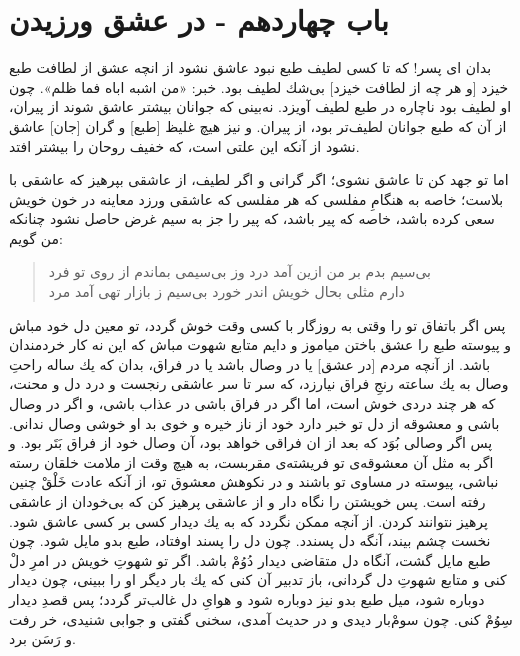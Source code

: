 
\section*{باب چهاردهم - 
در عشق ورزيدن}



بدان اى پسر! كه تا كسى لطيف طبع نبود عاشق نشود از انچه عشق از لطافت طبع خيزد [و هر چه از لطافت خيزد] بى‌شك لطيف بود. خبر: «من اشبه اباه فما ظلم». چون او لطيف بود ناچاره در طبع لطيف آويزد. نه‌بينى كه جوانان بيشتر عاشق شوند از پيران، از آن كه طبع جوانان لطيف‌تر بود، از پيران. و نيز هيچ غليظ [طبع] و گران [جان] عاشق نشود از آنكه اين علتى است، كه خفيف روحان را بيشتر افتد.

اما تو جهد كن تا عاشق نشوى؛ اگر گرانى و اگر لطيف، از عاشقى بپرهيز كه عاشقى با بلاست؛ خاصه به هنگامِ مفلسى كه هر مفلسى كه عاشقى ورزد معاينه در خون خويش سعى كرده باشد، خاصه كه پير باشد، كه پير را جز به سيم غرض حاصل نشود چنانكه من گويم:

\begin{quote}
\centering
بى‌سيم بدم بر من ازين آمد درد \quad \quad وز بى‌سيمى بماندم از روى تو فرد \\
دارم مثلى بحال خويش اندر خورد \quad \quad بى‌سيم ز بازار تهى آمد مرد
\end{quote}

پس اگر باتفاق تو را وقتى به روزگار با كسى وقت خوش گردد، تو معين دل خود مباش و پيوسته طبع را عشق باختن مياموز و دايم متابع شهوت مباش كه اين نه كار خردمندان باشد. از آنچه مردم [در عشق] يا در وصال باشد يا در فراق، بدان كه يك ساله راحت‌ِ وصال به يك ساعته رنجِ فراق نیارزد، كه سر تا سر عاشقى رنجست و درد دل و محنت، كه هر چند دردى خوش است، اما اگر در فراق باشى در عذاب باشى، و اگر در وصال باشى و معشوقه از دل تو خبر دارد خود از ناز خيره و خوى بد او خوشى وصال ندانى. پس اگر وصالى بُوَد كه بعد از ان فراقى خواهد بود، آن وصال خود از فراق بَتَر بود. و اگر به مثل آن معشوقه‌ی تو فريشته‌ی مقربست، به هيچ وقت از ملامت خلقان رسته نباشى، پيوسته در مساوى تو باشند و در نكوهش معشوق تو، از آنكه عادت خَلْقْ چنين رفته است. پس خويشتن را نگاه دار و از عاشقى پرهيز كن كه بى‌خودان از عاشقى پرهيز نتوانند كردن. از آنچه ممكن نگردد كه به يك ديدار كسى بر كسى عاشق شود. نخست چشم بيند، آنگه دل پسندد. چون دل را پسند اوفتاد، طبع بدو مايل شود. چون طبع مايل گشت، آنگاه دل متقاضى ديدار دُوُمْ باشد. اگر تو شهوتِ خويش در امرِ دلْ كنى و متابع شهوتِ دل گردانى، باز تدبير آن كنى كه يك بار ديگر او را ببينى، چون ديدار دوباره شود، ميل طبع بدو نيز دوباره شود و هواىِ دل غالب‌تر گردد؛ پس قصدِ ديدار سِوُمْ كنى. چون سومْ‌بار ديدى و در حديث آمدى، سخنى گفتى و جوابى شنيدى، خر رفت و رَسَن برد.

